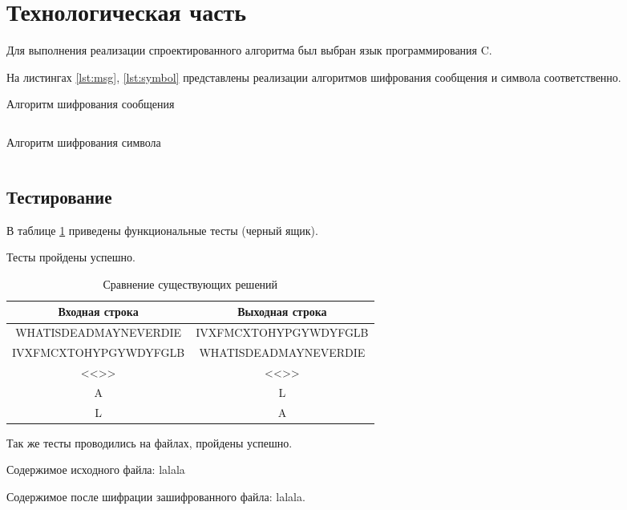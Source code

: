\section{Технологическая часть}

Для выполнения реализации спроектированного алгоритма был выбран язык программирования C.

На листингах \ref{lst:msg}, \ref{lst:symbol} представлены реализации алгоритмов шифрования сообщения и символа соответственно.

\begin{listing}[H]
	\caption{Алгоритм шифрования сообщения}
	\inputminted[frame=single,fontsize = \footnotesize, linenos, breaklines, xleftmargin = 1.5em,breaksymbol = ""]{C++}{../lst/msg.cpp}
	\label{lst:msg}
\end{listing}

\begin{listing}[H]
	\caption{Алгоритм шифрования символа}
	\inputminted[frame=single,fontsize = \footnotesize, linenos, breaklines, xleftmargin = 1.5em,breaksymbol = ""]{C++}{../lst/symb.cpp}
	\label{lst:symbol}
\end{listing}

\subsection{Тестирование}

В таблице \ref{tab:test} приведены функциональные тесты (черный ящик).

Тесты пройдены успешно.

\begin{table}[htb]
	\caption{\centering Сравнение существующих решений}
	\small
	\centering\begin{tabular}{| c | c |}
		\hline
		Входная строка				& Выходная строка \\\hline
		WHATISDEADMAYNEVERDIE & IVXFMCXTOHYPGYWDYFGLB \\\hline
		IVXFMCXTOHYPGYWDYFGLB & WHATISDEADMAYNEVERDIE \\\hline
		<<>> & <<>> \\\hline
		A & L \\ \hline
		L & A \\ \hline
	\end{tabular}
	\label{tab:test}
\end{table}

Так же тесты проводились на файлах, пройдены успешно.

Содержимое исходного файла: lalala

Содержимое после шифрации зашифрованного файла: lalala.